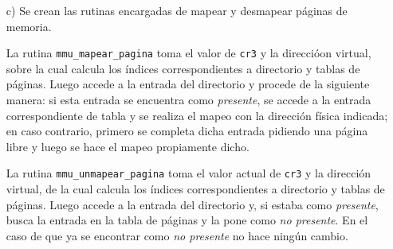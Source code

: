 \begin{enumerate}
\item[c)] Se crean las rutinas encargadas de mapear y desmapear páginas de memoria.

La rutina {\tt mmu\_mapear\_pagina} toma el valor de {\tt cr3} y la direccióon virtual, sobre la cual calcula los índices correspondientes a directorio y tablas de páginas. Luego accede a la entrada del directorio y procede de la siguiente manera: si esta entrada se encuentra como {\it presente}, se accede a la entrada correspondiente de tabla y se realiza el mapeo con la dirección física indicada; en caso contrario, primero se completa dicha entrada pidiendo una página libre y luego se hace el mapeo propiamente dicho.

La rutina {\tt mmu\_unmapear\_pagina} toma el valor actual de {\tt cr3} y la dirección virtual, de la cual calcula los índices correspondientes a directorio y tablas de páginas.  Luego accede a la entrada del directorio y, si estaba como {\it presente}, busca la entrada en la tabla de p\'aginas y la pone como {\it no presente}. En el caso de que ya se encontrar como {\it no presente} no hace ningún cambio.

\end{enumerate}